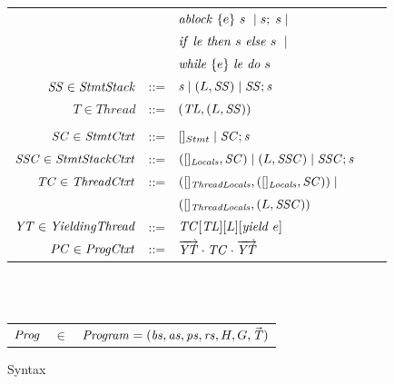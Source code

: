 \begin{figure}
\begin{tabular}{rclcl}
                  & & $\mathit{ablock}\ {\{e\}}\ {s}\  \mid s;\;s \mid$\\
                 & & ${\mathit{if}\ {\mathit{le}}\ }{\mathit{then}\ {s}\ }{\mathit{else}\ {s}\ } \mid$ \\
                  & & $\mathit{while}\ \{{e}\}\ {{\mathit{le}}\ } \mathit{do}\ {{s}\ }$ \\ 
$\mathit{SS} \in \mathit{StmtStack}$ &::= & $\mathit{s} \mid (L,\mathit{SS}) \mid \mathit{SS};\mathit{s}$ \\
$T \in \mathit{Thread}$ &::= &$(\mathit{TL}, (L, \mathit{SS}))$ \\
\\
$\mathit{SC} \in \mathit{StmtCtxt}$ &::= &$[]_{Stmt} \mid \mathit{SC};\mathit{s}$ \\
$\mathit{SSC} \in \mathit{StmtStackCtxt}$ &::= & $([]_{\mathit{Locals}}, \mathit{SC}) \mid (L,\mathit{SSC}) \mid \mathit{SSC};\mathit{s}$ \\
$\mathit{TC} \in \mathit{ThreadCtxt}$ &::= &$([]_{\mathit{ThreadLocals}}, ([]_{\mathit{Locals}}, \mathit{SC})) \mid$ \\
 & &$([]_{\mathit{ThreadLocals}}, (L, \mathit{SSC}))$ \\
$\mathit{YT} \in \mathit{YieldingThread}$ &::= &$\mathit{TC}[\mathit{TL}][L][\mathit{yield}\ e]$ \\
$\mathit{PC} \in \mathit{ProgCtxt}$ &::= &$\overrightarrow{\mathit{YT}} \cdot \mathit{TC} \cdot \overrightarrow{\mathit{YT}}$ \\
\end{tabular}
~\\
~\\
\begin{tabular}{rcl}
$\mathit{Prog}$ & $\in$ & $\mathit{Program} = (\mathit{bs}, \mathit{as}, \mathit{ps}, \mathit{rs}, H, G, \vec{\mathit{T}})$ \\
\end{tabular}
\setlength{\tabcolsep}{6pt}
\caption{Syntax}
\label{fig:syntax}
\end{figure}

